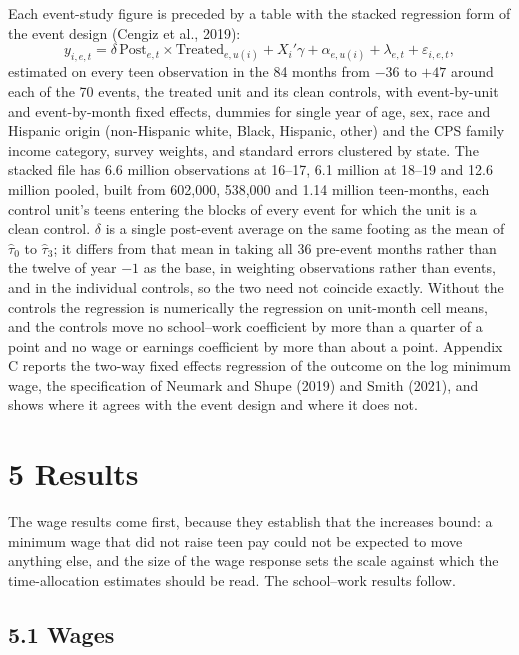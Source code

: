 \documentclass[12pt]{article}
\begin{document}
Each event-study figure is preceded by a table with the stacked regression form of the event design (Cengiz et al., 2019):
\begin{equation}
y_{i,e,t} = \delta\, \mathrm{Post}_{e,t} \times \mathrm{Treated}_{e,u(i)} + X_i'\gamma + \alpha_{e,u(i)} + \lambda_{e,t} + \varepsilon_{i,e,t},

\end{equation}
estimated on every teen observation in the 84 months from $-36$ to $+47$ around each of the 70 events, the treated unit and its clean controls, with event-by-unit and event-by-month fixed effects, dummies for single year of age, sex, race and Hispanic origin (non-Hispanic white, Black, Hispanic, other) and the CPS family income category, survey weights, and standard errors clustered by state. The stacked file has 6.6 million observations at 16--17, 6.1 million at 18--19 and 12.6 million pooled, built from 602,000, 538,000 and 1.14 million teen-months, each control unit's teens entering the blocks of every event for which the unit is a clean control. $\delta$ is a single post-event average on the same footing as the mean of $\hat\tau_0$ to $\hat\tau_3$; it differs from that mean in taking all 36 pre-event months rather than the twelve of year $-1$ as the base, in weighting observations rather than events, and in the individual controls, so the two need not coincide exactly. Without the controls the regression is numerically the regression on unit-month cell means, and the controls move no school--work coefficient by more than a quarter of a point and no wage or earnings coefficient by more than about a point. Appendix C reports the two-way fixed effects regression of the outcome on the log minimum wage, the specification of Neumark and Shupe (2019) and Smith (2021), and shows where it agrees with the event design and where it does not.

\section{5 Results}

The wage results come first, because they establish that the increases bound: a minimum wage that did not raise teen pay could not be expected to move anything else, and the size of the wage response sets the scale against which the time-allocation estimates should be read. The school--work results follow.

\subsection{5.1 Wages}
\end{document}

